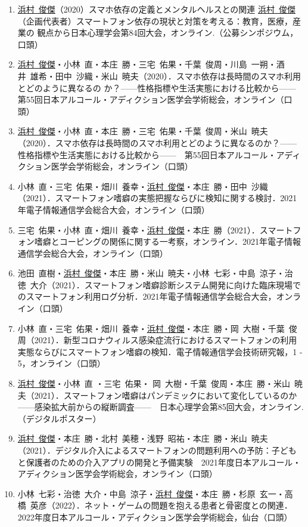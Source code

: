 \documentclass[11pt,a4paper]{article}
\begin{document}
\begin{enumerate}
	\item \underline{浜村\ 俊傑}（2020）スマホ依存の定義とメンタルヘルスとの関連	\underline{浜村\ 俊傑}（企画代表者）スマートフォン依存の現状と対策を考える：教育，医療，産業の	観点から日本心理学会第84回大会，オンライン.（公募シンポジウム，口頭）
	\item \underline{浜村\ 俊傑}・小林\ 直・本庄\ 勝・三宅\ 佑果・千葉\ 俊周・川島\ 一朔・酒井\ 雄希・田中\ 沙織・米山\ 暁夫（2020）．スマホ依存は長時間のスマホ利用とどのように異なるの	か？——性格指標や生活実態における比較から——　第55回日本アルコール・アディクション医学会学術総会，オンライン（口頭）
	\item \underline{浜村\ 俊傑}・小林\ 直・本庄\ 勝・三宅\ 佑果・千葉\ 俊周・米山\ 暁夫（2020）．スマホ依存は長時間のスマホ利用とどのように異なるのか？——性格指標や生活実態における比較から——　第55回日本アルコール・アディクション医学会学術総会，オンライン（口頭）
	\item 小林\ 直・三宅\ 佑果・畑川\ 養幸・\underline{浜村\ 俊傑}・本庄\ 勝・田中\ 沙織（2021）．スマートフォン嗜癖の実態把握ならびに検知に関する検討．2021年電子情報通信学会総合大会，オンライン（口頭）
	\item 三宅\ 佑果・小林\ 直・畑川\ 養幸・\underline{浜村\ 俊傑}・本庄\ 勝（2021）．スマートフォン嗜癖とコーピングの関係に関する一考察，オンライン．2021年電子情報通信学会総合大会，オンライン（口頭）
	\item 池田\ 直樹・\underline{浜村\ 俊傑}・本庄\ 勝・米山\ 暁夫・小林\ 七彩・中島\ 涼子・治徳\ 大介（2021）．スマートフォン嗜癖診断システム開発に向けた臨床現場でのスマートフォン利用ログ分析．2021年電子情報通信学会総合大会，オンライン（口頭）
	\item 小林\ 直・三宅\ 佑果・畑川\ 養幸・\underline{浜村\ 俊傑}・本庄\ 勝・岡\ 大樹・千葉\ 俊周（2021）．新型コロナウィルス感染症流行におけるスマートフォンの利用実態ならびにスマートフォン嗜癖の検知．電子情報通信学会技術研究報，1 - 5，オンライン（口頭）
	\item \underline{浜村\ 俊傑}・小林\ 直 ・三宅\ 佑果・ 岡\ 大樹・千葉\ 俊周・本庄\ 勝・米山\ 暁夫（2021）．スマートフォン嗜癖はパンデミックにおいて変化しているのか——感染拡大前からの縦断調査——　日本心理学会第85回大会，オンライン.（デジタルポスター）
	\item \underline{浜村\ 俊傑}・本庄\ 勝・北村\ 美穂・浅野\ 昭祐・本庄\ 勝・米山\ 暁夫（2021）．デジタル介入によるスマートフォンの問題利用への予防：子どもと保護者のための介入アプリの開発と予備実験　2021年度日本アルコール・アディクション医学会学術総会，オンライン（口頭）
	\item 小林\ 七彩・治徳\ 大介・中島\ 涼子・\underline{浜村\ 俊傑}・本庄\ 勝・杉原\ 玄一・高橋\ 英彦（2022）．ネット・ゲームの問題を抱える患者と骨密度との関連．2022年度日本アルコール・アディクション医学会学術総会，仙台（口頭）

\end{enumerate}
\end{document}
